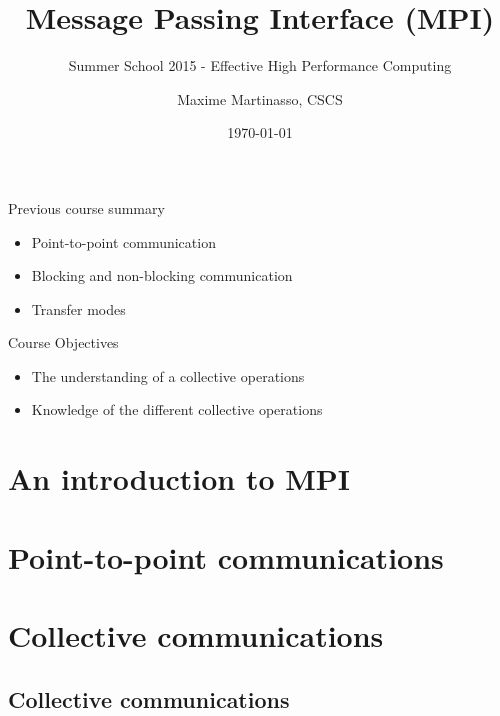 \documentclass[aspectratio=43]{beamer}
\author{Maxime Martinasso, CSCS}
\title{Message Passing Interface (MPI)}
\subtitle{Summer School 2015 - Effective High Performance Computing}
\date{\today}
\begin{document}
\cscstitle

\begin{frame}{Previous course summary}
\begin{itemize}
\item Point-to-point communication
\item Blocking and non-blocking communication
\item Transfer modes
\end{itemize}
\end{frame}

\begin{frame}{Course Objectives}
\begin{itemize}
\item The understanding of a collective operations
\item Knowledge of the different collective operations
\end{itemize}
\end{frame}


\section{An introduction to MPI}
\section{Point-to-point communications}
\section{Collective communications}


\subsection{Collective communications}
\end{document}
